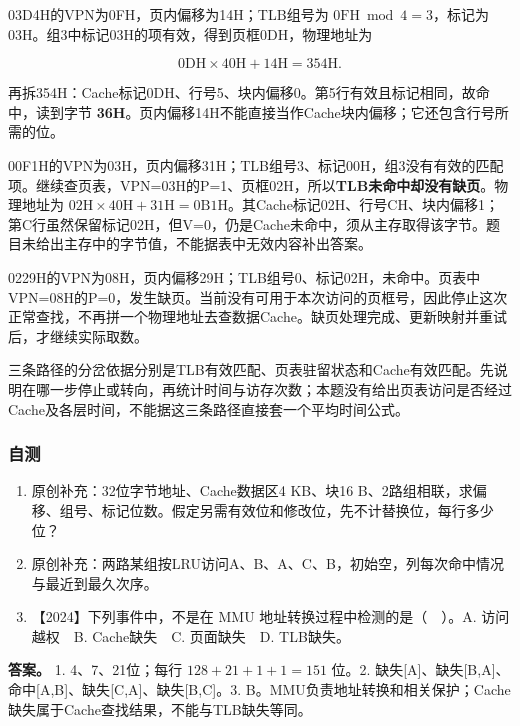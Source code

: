 03D4H的VPN为0FH，页内偏移为14H；TLB组号为 \(0\mathrm{FH}\bmod4=3\)，标记为03H。组3中标记03H的项有效，得到页框0DH，物理地址为

\[
0\mathrm{DH}\times40\mathrm{H}+14\mathrm{H}=354\mathrm{H}.
\]

再拆354H：Cache标记0DH、行号5、块内偏移0。第5行有效且标记相同，故命中，读到字节 \textbf{36H}。页内偏移14H不能直接当作Cache块内偏移；它还包含行号所需的位。

00F1H的VPN为03H，页内偏移31H；TLB组号3、标记00H，组3没有有效的匹配项。继续查页表，VPN=03H的P=1、页框02H，所以\textbf{TLB未命中却没有缺页}。物理地址为 \(02\mathrm{H}\times40\mathrm{H}+31\mathrm{H}=0\mathrm{B1H}\)。其Cache标记02H、行号CH、块内偏移1；第C行虽然保留标记02H，但V=0，仍是Cache未命中，须从主存取得该字节。题目未给出主存中的字节值，不能据表中无效内容补出答案。

0229H的VPN为08H，页内偏移29H；TLB组号0、标记02H，未命中。页表中VPN=08H的P=0，发生缺页。当前没有可用于本次访问的页框号，因此停止这次正常查找，不再拼一个物理地址去查数据Cache。缺页处理完成、更新映射并重试后，才继续实际取数。

三条路径的分岔依据分别是TLB有效匹配、页表驻留状态和Cache有效匹配。先说明在哪一步停止或转向，再统计时间与访存次数；本题没有给出页表访问是否经过Cache及各层时间，不能据这三条路径直接套一个平均时间公式。

\subsubsection{自测}\label{co-self3}

\begin{enumerate}
\def\labelenumi{\arabic{enumi}.}
\tightlist
\item
  原创补充：32位字节地址、Cache数据区4 KB、块16 B、2路组相联，求偏移、组号、标记位数。假定另需有效位和修改位，先不计替换位，每行多少位？
\item
  原创补充：两路某组按LRU访问A、B、A、C、B，初始空，列每次命中情况与最近到最久次序。
\item
  【2024】下列事件中，不是在 MMU 地址转换过程中检测的是（　）。A. 访问越权　B. Cache缺失　C. 页面缺失　D. TLB缺失。
\end{enumerate}

\textbf{答案。} 1. 4、7、21位；每行 \(128+21+1+1=151\) 位。2. 缺失{[}A{]}、缺失{[}B,A{]}、命中{[}A,B{]}、缺失{[}C,A{]}、缺失{[}B,C{]}。3. B。MMU负责地址转换和相关保护；Cache缺失属于Cache查找结果，不能与TLB缺失等同。

